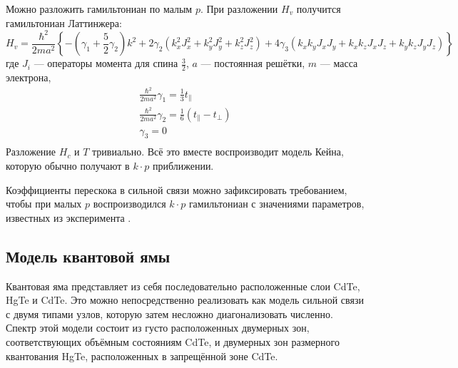 Можно разложить гамильтониан по малым $p$.
При разложении $H_v$ получится
гамильтониан Латтинжера:
\begin{equation}
    H_v = \frac{\hbar^2}{2ma^2}\left\{-\left(\gamma_1 + \frac{5}{2}\gamma_2\right) k^2 + 
        2\gamma_2(k_x^2J_x^2 + k_y^2J_y^2 + k_z^2J_z^2) + 
        4\gamma_3(k_x k_y J_x J_y + k_x k_z J_x J_z + k_y k_z J_y J_z) \right\}
\end{equation}
где $J_i$ --- операторы момента для спина $\frac{3}{2}$, $a$ --- постоянная решётки,
$m$ --- масса электрона,
\begin{equation}
    \begin{gathered}
        \frac{\hbar^2}{2ma^2}\gamma_1 = \frac13 t_\parallel\\
        \frac{\hbar^2}{2ma^2}\gamma_2 = \frac16(t_\parallel - t_\perp)\\
        \gamma_3 = 0\\
    \end{gathered}
\end{equation}
Разложение $H_c$ и $T$ тривиально.
Всё это вместе воспроизводит модель Кейна, которую обычно получают в $k \cdot p$ приближении.

Коэффициенты перескока в сильной связи можно зафиксировать требованием, чтобы при малых $p$ 
воспроизводился $k\cdot p$ гамильтониан с значениями параметров, известных из эксперимента
\cite{Novik2005}. 

\subsection{Модель квантовой ямы}
Квантовая яма представляет из себя последовательно расположенные слои CdTe, HgTe и CdTe.
Это можно непосредственно реализовать как модель сильной связи с двумя типами узлов, которую
затем несложно диагонализовать численно. Спектр этой модели состоит из густо расположенных
двумерных зон, соответствующих объёмным состояниям CdTe, и двумерных зон размерного квантования
HgTe, расположенных в запрещённой зоне CdTe.

